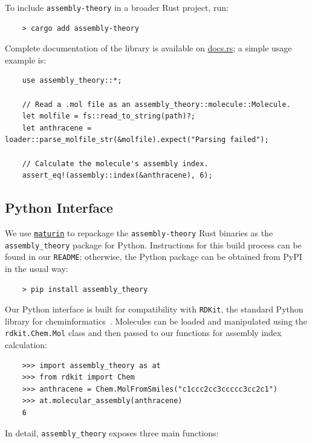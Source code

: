 \documentclass[acmsmall,nonacm,screen]{acmart}  %
\begin{document}
To include \texttt{assembly-theory} in a broader Rust project, run:

\begin{verbatim}
    > cargo add assembly-theory
\end{verbatim}

Complete documentation of the library is available on \href{https://docs.rs/assembly-theory/latest/assembly_theory}{docs.rs}; a simple usage example is:

\begin{verbatim}
    use assembly_theory::*;

    // Read a .mol file as an assembly_theory::molecule::Molecule.
    let molfile = fs::read_to_string(path)?;
    let anthracene = loader::parse_molfile_str(&molfile).expect("Parsing failed");

    // Calculate the molecule's assembly index.
    assert_eq!(assembly::index(&anthracene), 6);
\end{verbatim}



\subsection{Python Interface} \label{subsec:python}

We use \href{https://github.com/PyO3/maturin}{\texttt{maturin}} to repackage the \texttt{assembly-theory} Rust binaries as the \texttt{assembly\_theory} package for Python.
Instructions for this build process can be found in our \texttt{README}; otherwise, the Python package can be obtained from PyPI in the usual way:

\begin{verbatim}
    > pip install assembly_theory
\end{verbatim}

Our Python interface is built for compatibility with \texttt{RDKit}, the standard Python library for cheminformatics~\cite{2024-rdkitopensource}.
Molecules can be loaded and manipulated using the \texttt{rdkit.Chem.Mol} class and then passed to our functions for assembly index calculation:

\begin{verbatim}
    >>> import assembly_theory as at
    >>> from rdkit import Chem
    >>> anthracene = Chem.MolFromSmiles("c1ccc2cc3ccccc3cc2c1")
    >>> at.molecular_assembly(anthracene)
    6
\end{verbatim}

In detail, \texttt{assembly\_theory} exposes three main functions:
\end{document}
